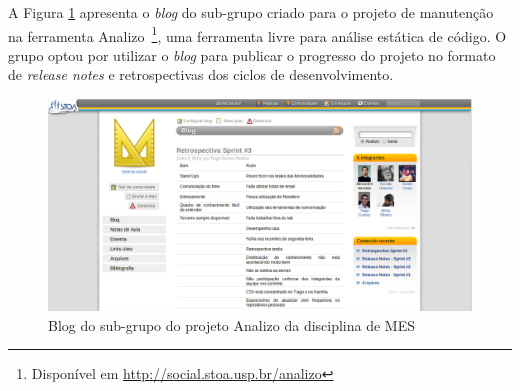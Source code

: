 A Figura \ref{analizo} apresenta o \textit{blog} do sub-grupo
criado para o projeto de manutenção na ferramenta Analizo~\footnote{Disponível
em \url{http://social.stoa.usp.br/analizo}}, uma ferramenta livre
para análise estática de código. O grupo optou por utilizar o \textit{blog}
para publicar o progresso do projeto no formato de \textit{release notes} e
retrospectivas dos ciclos de desenvolvimento.

\begin{figure}[h]
	\centering
	\includegraphics[keepaspectratio=true,scale=0.3]
	  {figuras/analizo.eps}
	\caption{Blog do sub-grupo do projeto Analizo da disciplina de MES }
	\label{analizo}
\end{figure}

